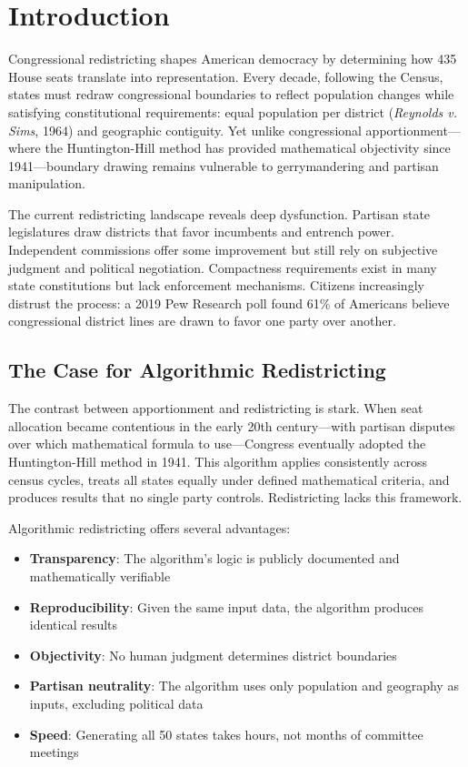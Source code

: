 \section{Introduction}

Congressional redistricting shapes American democracy by determining how 435 House seats translate into representation. Every decade, following the Census, states must redraw congressional boundaries to reflect population changes while satisfying constitutional requirements: equal population per district (\textit{Reynolds v. Sims}, 1964) and geographic contiguity. Yet unlike congressional apportionment—where the Huntington-Hill method has provided mathematical objectivity since 1941—boundary drawing remains vulnerable to gerrymandering and partisan manipulation.

The current redistricting landscape reveals deep dysfunction. Partisan state legislatures draw districts that favor incumbents and entrench power. Independent commissions offer some improvement but still rely on subjective judgment and political negotiation. Compactness requirements exist in many state constitutions but lack enforcement mechanisms. Citizens increasingly distrust the process: a 2019 Pew Research poll found 61\% of Americans believe congressional district lines are drawn to favor one party over another.

\subsection{The Case for Algorithmic Redistricting}

The contrast between apportionment and redistricting is stark. When seat allocation became contentious in the early 20th century—with partisan disputes over which mathematical formula to use—Congress eventually adopted the Huntington-Hill method in 1941. This algorithm applies consistently across census cycles, treats all states equally under defined mathematical criteria, and produces results that no single party controls. Redistricting lacks this framework.

Algorithmic redistricting offers several advantages:

\begin{itemize}
\item \textbf{Transparency}: The algorithm's logic is publicly documented and mathematically verifiable
\item \textbf{Reproducibility}: Given the same input data, the algorithm produces identical results
\item \textbf{Objectivity}: No human judgment determines district boundaries
\item \textbf{Partisan neutrality}: The algorithm uses only population and geography as inputs, excluding political data
\item \textbf{Speed}: Generating all 50 states takes hours, not months of committee meetings
\end{itemize}

